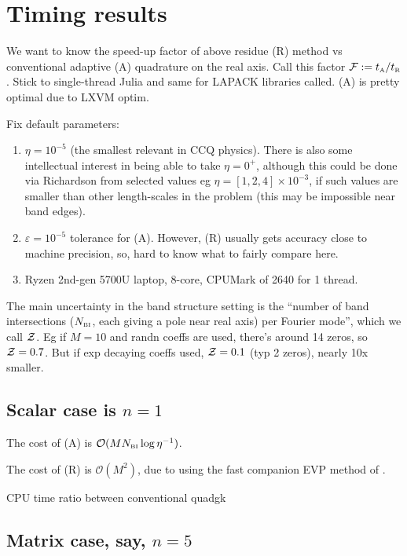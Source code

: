 \documentclass[11pt]{article}
\newcommand{\ben}{\begin{enumerate}}
\newcommand{\een}{\end{enumerate}}
\newcommand{\tbox}[1]{{\mbox{\tiny #1}}}
\newcommand{\eps}{\varepsilon}
\newcommand{\bigO}{{\mathcal O}}
\begin{document}
\section{Timing results}

We want to know the speed-up factor of above residue (R) method vs
conventional adaptive (A) quadrature on the real axis.
Call this
factor ${\cal F} := t_\tbox{A}/t_\tbox{R}$.
Stick to single-thread Julia and same for LAPACK libraries called.
(A) is pretty optimal due to LXVM optim.

Fix default parameters:
\ben
\item
  $\eta=10^{-5}$ (the smallest relevant in CCQ physics). There is also some intellectual interest in being able to take
  $\eta=0^+$, although this could be done via Richardson from selected
  values eg $\eta = [1,2,4]\times 10^{-3}$, if such values are smaller than
  other length-scales in the problem (this may be impossible near band edges).
\item
  $\eps = 10^{-5}$ tolerance for (A). However, (R) usually gets accuracy
  close to machine precision,
  so, hard to know what to fairly compare here.
\item Ryzen 2nd-gen 5700U laptop, 8-core, CPUMark of 2640 for 1 thread.
\een
  
The main uncertainty in the band structure setting is the
``number of band intersections ($N_\tbox{BI}$, each giving a pole near real axis) per Fourier mode'',
which we call ${\cal Z}$.
Eg if $M=10$ and randn coeffs are used, there's around 14 zeros,
so ${\cal Z} = 0.7$.
But if exp decaying coeffs used, ${\cal Z} = 0.1$ (typ 2 zeros),
nearly 10x smaller.


\subsection{Scalar case is $n=1$}

The cost of (A) is $\bigO(M N_\tbox{BI} \log \eta^{-1})$. 

The cost of (R) is $\bigO(M^2)$, due to using the fast companion EVP
method of \cite{aurentz1,aurentz2}.






CPU time ratio between conventional
quadgk


  \subsection{Matrix case, say, $n=5$}
\end{document}
